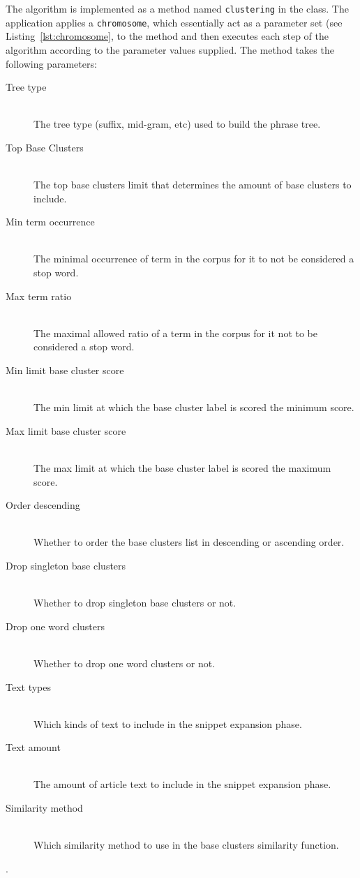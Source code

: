 The \CTC algorithm is implemented as a method named \texttt{clustering} in the \CTC class. The application applies a \texttt{chromosome}, which essentially act as a parameter set (see Listing~\ref{lst:chromosome}, to the method and then executes each step of the \CTC algorithm according to the parameter values supplied. The method takes the following parameters:
\begin{description}
\item[Tree type]\hfill \\The tree type (suffix, mid-gram, etc) used to build the phrase tree.
\item[Top Base Clusters]\hfill \\The top base clusters limit that determines the amount of base clusters to include.
\item[Min term occurrence]\hfill \\The minimal occurrence of term in the corpus for it to not be considered a stop word.
\item[Max term ratio]\hfill \\The maximal allowed ratio of a term in the corpus for it not to be considered a stop word.
\item[Min limit base cluster score]\hfill \\The min limit at which the base cluster label is scored the minimum score.
\item[Max limit base cluster score]\hfill \\The max limit at which the base cluster label is scored the maximum score.
\item[Order descending]\hfill \\Whether to order the base clusters list in descending or ascending order.
\item[Drop singleton base clusters]\hfill \\Whether to drop singleton base clusters or not.
\item[Drop one word clusters]\hfill \\Whether to drop one word clusters or not.
\item[Text types]\hfill \\Which kinds of text to include in the snippet expansion phase.
\item[Text amount]\hfill \\The amount of article text to include in the snippet expansion phase.
\item[Similarity method]\hfill \\Which similarity method to use in the base clusters similarity function.
\end{description}.

